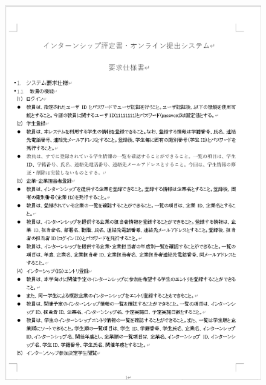 \documentclass[uplatex, report, a4j, 10pt]{jsbook}
\begin{document}
\begin{figure}[tp]
    \begin{center}
    \includegraphics[width=\hsize]{specification/internship_1.eps}
    \end{center}
\end{figure}
\end{document}
